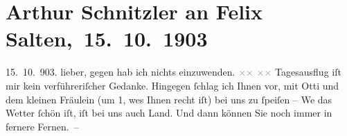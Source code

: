 

         
         \renewcommand{\erwaehntePersonen}{Personen: Caroline Kotter, Felix Salten, Ottilie Salten}
         \renewcommand{\erwaehnteInstitutionen}{Institutionen: Neue akademische Vereinigung}
         \renewcommand{\erwaehnteOrte}{Orte: Brünn, Deutsches Haus, Wien}
         \renewcommand{\erwaehnteWerke}{}
               \section[ Arthur Schnitzler an Felix Salten, 15. 10. 1903]{ Arthur Schnitzler an Felix Salten, 15. 10. 1903}\nopagebreak{}\rehead{ }\begin{ledgroupsized}[t]{13cm}\normalsize\beginnumbering{} \toendnotes[C]{\smallbreak\pagebreak[2]} 
\toendnotes[C]{\smallbreak}\pstart
           \raggedleft{}{\pb}15. 10. 903.\pend
           \pstart
           lieber, gegen \label{K_L02985-1v}\label{K_L02985-1h} hab ich nichts einzuwenden. \textcolor{gray}{×}\-\textcolor{gray}{×}{ }\textcolor{gray}{×}\-\textcolor{gray}{×}\pend
           \pstart
           Tagesausflug iſt mir kein verführeriſcher Gedanke. Hingegen ſchlag ich Ihnen vor, mit
                  Otti und dem kleinen Fräulein\label{K_L02985-2v}\label{K_L02985-2h} (um 1, we{\geminationn}s {\pb}Ihnen recht iſt) bei uns zu ſpeiſen – We{\geminationn} das Wetter ſchön iſt, iſt bei uns auch Land. Und dann
               können Sie noch immer in fernere Fernen. –\pend
           \pstart

\end{ledgroupsized}
